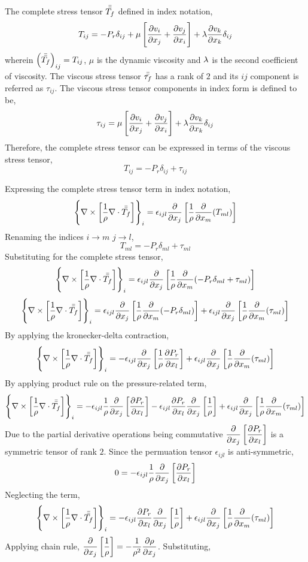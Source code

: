 \documentclass[class=report, 12pt, crop=false]{standalone}
\begin{document}
\begin{center}
The complete stress tensor $\bar{\bar{T_f}}$ defined in index notation,
$$T_{ij} = -P_r\delta_{ij} + \mu\left[\frac{\partial v_i}{\partial x_j} + \frac{\partial v_j}{\partial x_i}\right] + \lambda\frac{\partial v_k}{\partial x_k}\delta_{ij}$$
wherein $\left(\bar{\bar{T_f}}\right)_{ij} = T_{ij}$, $\mu$ is the dynamic viscosity and $\lambda$ is the second coefficient of viscosity. The viscous stress tensor $\bar{\bar{\tau_f}}$ has a rank of $2$ and its $ij$ component is referred as $\tau_{ij}$. The viscous stress tensor components in index form is defined to be,
$$\tau_{ij} = \mu\left[\frac{\partial v_i}{\partial x_j} + \frac{\partial v_j}{\partial x_i}\right] + \lambda\frac{\partial v_k}{\partial x_k}\delta_{ij}$$
Therefore, the complete stress tensor can be expressed in terms of the viscous stress tensor,
$$T_{ij} = -P_r\delta_{ij} + \tau_{ij}$$

Expressing the complete stress tensor term in index notation,
$$\left\{\nabla\times\left[\frac{1}{\rho}\nabla\cdot\bar{\bar{T_f}}\right]\right\}_i = \epsilon_{ijl}\frac{\partial}{\partial x_j}\left[\frac{1}{\rho}\frac{\partial }{\partial x_m}(T_{ml})\right]$$
Renaming the indices $i\to m$ $j\to l$,
$$T_{ml} = -P_r\delta_{ml} + \tau_{ml}$$
Substituting for the complete stress tensor,
$$\left\{\nabla\times\left[\frac{1}{\rho}\nabla\cdot\bar{\bar{T_f}}\right]\right\}_i = \epsilon_{ijl}\frac{\partial}{\partial x_j}\left[\frac{1}{\rho}\frac{\partial }{\partial x_m}(-P_r\delta_{ml} + \tau_{ml})\right]$$
$$\left\{\nabla\times\left[\frac{1}{\rho}\nabla\cdot\bar{\bar{T_f}}\right]\right\}_i = \epsilon_{ijl}\frac{\partial}{\partial x_j}\left[\frac{1}{\rho}\frac{\partial }{\partial x_m}(-P_r\delta_{ml})\right] + \epsilon_{ijl}\frac{\partial}{\partial x_j}\left[\frac{1}{\rho}\frac{\partial }{\partial x_m}(\tau_{ml})\right]$$
By applying the kronecker-delta contraction,
$$\left\{\nabla\times\left[\frac{1}{\rho}\nabla\cdot\bar{\bar{T_f}}\right]\right\}_i = -\epsilon_{ijl}\frac{\partial}{\partial x_j}\left[\frac{1}{\rho}\frac{\partial P_r}{\partial x_l}\right] + \epsilon_{ijl}\frac{\partial}{\partial x_j}\left[\frac{1}{\rho}\frac{\partial }{\partial x_m}(\tau_{ml})\right]$$
By applying product rule on the pressure-related term,
$$\left\{\nabla\times\left[\frac{1}{\rho}\nabla\cdot\bar{\bar{T_f}}\right]\right\}_i = -\epsilon_{ijl}\frac{1}{\rho}\frac{\partial}{\partial x_j}\left[\frac{\partial P_r}{\partial x_l}\right]          -\epsilon_{ijl}\frac{\partial P_r}{\partial x_l}\frac{\partial}{\partial x_j}\left[\frac{1}{\rho}\right]            + \epsilon_{ijl}\frac{\partial}{\partial x_j}\left[\frac{1}{\rho}\frac{\partial }{\partial x_m}(\tau_{ml})\right]$$
Due to the partial derivative operations being commutative $\displaystyle \frac{\partial}{\partial x_j}\left[\frac{\partial P_r}{\partial x_l}\right]$ is a symmetric tensor of rank $2$. Since the permuation tensor $\epsilon_{ijl}$ is anti-symmetric,
$$0 = -\epsilon_{ijl}\frac{1}{\rho}\frac{\partial}{\partial x_j}\left[\frac{\partial P_r}{\partial x_l}\right]$$
Neglecting the term,
$$\left\{\nabla\times\left[\frac{1}{\rho}\nabla\cdot\bar{\bar{T_f}}\right]\right\}_i =          -\epsilon_{ijl}\frac{\partial P_r}{\partial x_l}\frac{\partial}{\partial x_j}\left[\frac{1}{\rho}\right]            + \epsilon_{ijl}\frac{\partial}{\partial x_j}\left[\frac{1}{\rho}\frac{\partial }{\partial x_m}(\tau_{ml})\right]$$
Applying chain rule, $\displaystyle \frac{\partial}{\partial x_j}\left[\frac{1}{\rho}\right] = -\frac{1}{\rho^2}\frac{\partial \rho}{\partial x_j}$. Substituting,

\end{center}
\end{document}
